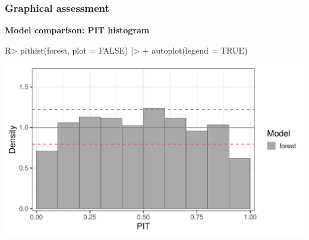\documentclass[11pt,t,usepdftitle=false,aspectratio=169]{beamer}
\begin{document}
\begin{frame}[fragile]
\frametitle{Graphical assessment}

\vspace{-0.75em}

\textbf{Model comparison: PIT histogram}

\vspace{0.5em}

\begin{Schunk}
\begin{Sinput}
R> pithist(forest, plot = FALSE) |>
+    autoplot(legend = TRUE)
\end{Sinput}
\end{Schunk}

\begin{center}
\includegraphics{slides-rain_topmodels_lm_pithist1_hist}
\end{center}

\end{frame}
\end{document}
